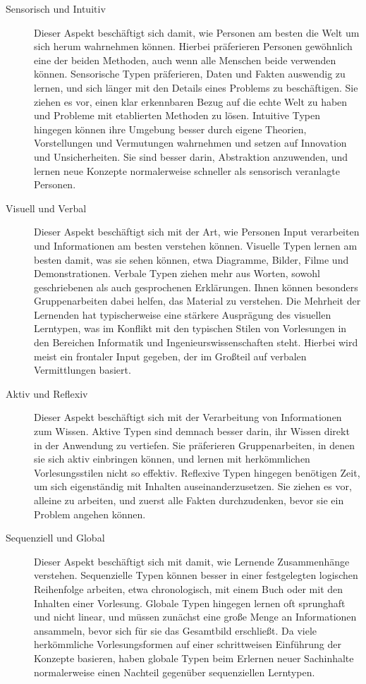 \begin{description}
    \item[Sensorisch und Intuitiv] Dieser Aspekt beschäftigt sich damit, wie Personen am besten die Welt um sich herum wahrnehmen können. Hierbei präferieren Personen gewöhnlich eine der beiden Methoden, auch wenn alle Menschen beide verwenden können. Sensorische Typen präferieren, Daten und Fakten auswendig zu lernen, und sich länger mit den Details eines Problems zu beschäftigen. Sie ziehen es vor, einen klar erkennbaren Bezug auf die echte Welt zu haben und Probleme mit etablierten Methoden zu lösen. Intuitive Typen hingegen können ihre Umgebung besser durch eigene Theorien, Vorstellungen und Vermutungen wahrnehmen und setzen auf Innovation und Unsicherheiten. Sie sind besser darin, Abstraktion anzuwenden, und lernen neue Konzepte normalerweise schneller als sensorisch veranlagte Personen.
    \item[Visuell und Verbal] Dieser Aspekt beschäftigt sich mit der Art, wie Personen Input verarbeiten und Informationen am besten verstehen können. Visuelle Typen lernen am besten damit, was sie sehen können, etwa Diagramme, Bilder, Filme und Demonstrationen. Verbale Typen ziehen mehr aus Worten, sowohl geschriebenen als auch gesprochenen Erklärungen. Ihnen können besonders Gruppenarbeiten dabei helfen, das Material zu verstehen. Die Mehrheit der Lernenden hat typischerweise eine stärkere Ausprägung des visuellen Lerntypen, was im Konflikt mit den typischen Stilen von Vorlesungen in den Bereichen Informatik und Ingenieurswissenschaften steht. Hierbei wird meist ein frontaler Input gegeben, der im Großteil auf verbalen Vermittlungen basiert.
    \item[Aktiv und Reflexiv]  Dieser Aspekt beschäftigt sich mit der Verarbeitung von Informationen zum Wissen. Aktive Typen sind demnach besser darin, ihr Wissen direkt in der Anwendung zu vertiefen. Sie präferieren Gruppenarbeiten, in denen sie sich aktiv einbringen können, und lernen mit herkömmlichen Vorlesungsstilen nicht so effektiv. Reflexive Typen hingegen benötigen Zeit, um sich eigenständig mit Inhalten auseinanderzusetzen. Sie ziehen es vor, alleine zu arbeiten, und zuerst alle Fakten durchzudenken, bevor sie ein Problem angehen können.
    \item[Sequenziell und Global] Dieser Aspekt beschäftigt sich mit damit, wie Lernende Zusammenhänge verstehen. Sequenzielle Typen können besser in einer festgelegten logischen Reihenfolge arbeiten, etwa chronologisch, mit einem Buch oder mit den Inhalten einer Vorlesung. Globale Typen hingegen lernen oft sprunghaft und nicht linear, und müssen zunächst eine große Menge an Informationen ansammeln, bevor sich für sie das Gesamtbild erschließt. Da viele herkömmliche Vorlesungsformen auf einer schrittweisen Einführung der Konzepte basieren, haben globale Typen beim Erlernen neuer Sachinhalte normalerweise einen Nachteil gegenüber sequenziellen Lerntypen.
\end{description}
